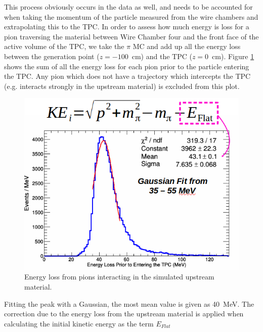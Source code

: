 This process obviously occurs in the data as well, and needs to be accounted for when taking the momentum of the particle measured from the wire chambers and extrapolating this to the TPC. In order to assess how much energy is loss for a pion traversing the material between Wire Chamber four and the front face of the active volume of the TPC, we take the $\pi$ MC and add up all the energy loss between the generation point ($z = -100$~cm) and the TPC ($z=0$~cm). Figure \ref{fig:EnergyLoss} shows the sum of all the energy loss for each pion prior to the particle entering the TPC. Any pion which does not have a trajectory which intercepts the TPC (e.g. interacts strongly in the upstream material) is excluded from this plot.

\begin{figure}[h!]
\centering
\includegraphics[scale=0.45]{./images/Eloss.png}
\caption{Energy loss from pions interacting in the simulated upstream material.}
\label{fig:EnergyLoss}
\end{figure}

Fitting the peak with a Gaussian, the most mean value is given as 40~MeV. The correction due to the energy loss from the upstream material is applied when calculating the initial kinetic energy as the term $E_{Flat}$